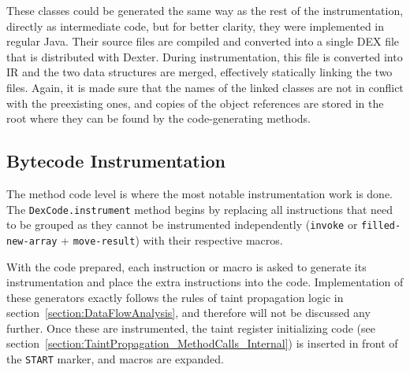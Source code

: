 \documentclass[12pt,twoside,notitlepage]{report}
\begin{document}
These classes could be generated the same way as the rest of the instrumentation, directly as intermediate code, but for better clarity, they were implemented in regular Java. Their source files are compiled and converted into a single DEX file that is distributed with Dexter. During instrumentation, this file is converted into IR and the two data structures are merged, effectively statically linking the two files. Again, it is made sure that the names of the linked classes are not in conflict with the preexisting ones, and copies of the object references are stored in the root where they can be found by the code-generating methods.

\subsection{Bytecode Instrumentation}

The method code level is where the most notable instrumentation work is done. The \verb$DexCode.instrument$ method begins by replacing all instructions that need to be grouped as they cannot be instrumented independently (\verb$invoke$ or \verb$filled-new-array$ + \verb$move-result$) with their respective macros. 

With the code prepared, each instruction or macro is asked to generate its instrumentation and place the extra instructions into the code. Implementation of these generators exactly follows the rules of taint propagation logic in section~\ref{section:DataFlowAnalysis}, and therefore will not be discussed any further. Once these are instrumented, the taint register initializing code (see section~\ref{section:TaintPropagation_MethodCalls_Internal}) is inserted in front of the \verb$START$ marker, and macros are expanded.
\end{document}
